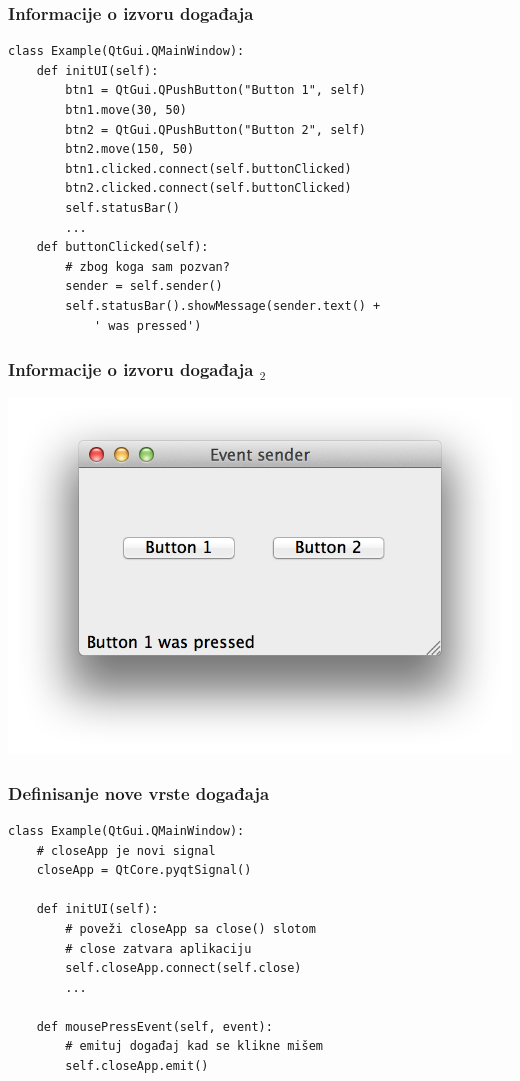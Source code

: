 \documentclass[utf8,compress]{beamer}
\begin{document}
\begin{frame}[fragile]
  \frametitle{Informacije o izvoru događaja}
\begin{verbatim}
class Example(QtGui.QMainWindow):
    def initUI(self):      
        btn1 = QtGui.QPushButton("Button 1", self)
        btn1.move(30, 50)
        btn2 = QtGui.QPushButton("Button 2", self)
        btn2.move(150, 50)
        btn1.clicked.connect(self.buttonClicked)            
        btn2.clicked.connect(self.buttonClicked)
        self.statusBar()
        ...
    def buttonClicked(self):
        # zbog koga sam pozvan?      
        sender = self.sender()
        self.statusBar().showMessage(sender.text() + 
            ' was pressed')
\end{verbatim}
\end{frame}

\begin{frame}[fragile]
  \frametitle{Informacije o izvoru događaja $_2$}
\begin{center}
\includegraphics[scale=0.5]{pyqt11.png}
\end{center}
\end{frame}

\begin{frame}[fragile]
  \frametitle{Definisanje nove vrste događaja}
\begin{verbatim}
class Example(QtGui.QMainWindow):
    # closeApp je novi signal
    closeApp = QtCore.pyqtSignal() 

    def initUI(self):
        # poveži closeApp sa close() slotom
        # close zatvara aplikaciju
        self.closeApp.connect(self.close)
        ...
        
    def mousePressEvent(self, event):
        # emituj događaj kad se klikne mišem
        self.closeApp.emit()
\end{verbatim}
\end{frame}
\end{document}
